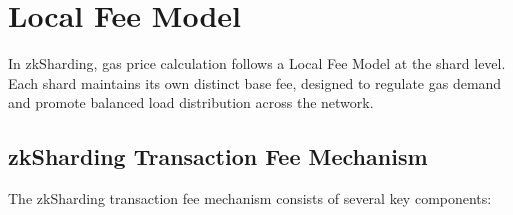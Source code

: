 \section{Local Fee Model}

In zkSharding, gas price calculation follows a Local Fee Model at the shard level. Each shard maintains its own distinct base fee, designed to regulate gas demand and promote balanced load distribution across the network.

\subsection{zkSharding Transaction Fee Mechanism}

The zkSharding transaction fee mechanism consists of several key components:

